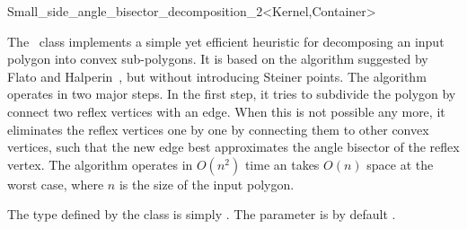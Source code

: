 
\ccRefPageBegin

\begin{ccRefClass}{Small_side_angle_bisector_decomposition_2<Kernel,Container>}
\label{mink_ref:ssab_decomp}

\ccDefinition

The \ccRefName\ class implements a simple yet efficient heuristic for
decomposing an input polygon into convex sub-polygons. It is based
on the algorithm suggested by Flato and Halperin~\cite{fh-recpm-00},
but without introducing Steiner points. The algorithm operates in two
major steps. In the first step, it tries to subdivide the polygon by
connect two reflex vertices with an edge. When this is not possible any
more, it eliminates the reflex vertices one by one by connecting them
to other convex vertices, such that the new edge best approximates
the angle bisector of the reflex vertex. The algorithm operates in
$O(n^2)$ time an takes $O(n)$ space at the worst case, where $n$ is the
size of the input polygon.

The  type defined by the class is simply
. The  parameter
is by default .


\ccIsModel

\end{ccRefClass}

\ccRefPageEnd
